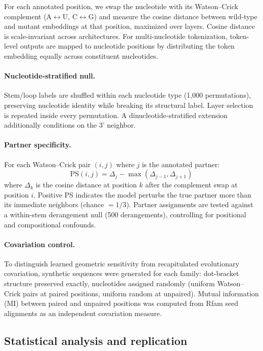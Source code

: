 \documentclass[11pt]{article}
\begin{document}
For each annotated position, we swap the nucleotide with its Watson--Crick
complement (A$\leftrightarrow$U, C$\leftrightarrow$G) and measure the cosine
distance between wild-type and mutant embeddings at that position, maximized
over layers. Cosine distance is scale-invariant across architectures.
For multi-nucleotide tokenization, token-level outputs are mapped to
nucleotide positions by distributing the token embedding equally across
constituent nucleotides.

\paragraph{Nucleotide-stratified null.}
Stem/loop labels are shuffled within each nucleotide type (1{,}000
permutations), preserving nucleotide identity while breaking its structural
label. Layer selection is repeated inside every permutation. A
dinucleotide-stratified extension additionally conditions on the 3' neighbor.

\paragraph{Partner specificity.}
\label{sec:ps-method}
For each Watson--Crick pair $(i, j)$ where $j$ is the annotated partner:
\[
\text{PS}(i,j) = \Delta_j - \max(\Delta_{j-1}, \Delta_{j+1})
\]
where $\Delta_k$ is the cosine distance at position $k$ after the complement
swap at position $i$. Positive PS indicates the model perturbs the true
partner more than its immediate neighbors (chance $= 1/3$). Partner
assignments are tested against a within-stem derangement null (500
derangements), controlling for positional and compositional confounds.

\paragraph{Covariation control.}
To distinguish learned geometric sensitivity from recapitulated evolutionary
covariation, synthetic sequences were generated for each family: dot-bracket
structure preserved exactly, nucleotides assigned randomly (uniform
Watson--Crick pairs at paired positions, uniform random at unpaired). Mutual
information (MI) between paired and unpaired positions was computed from Rfam
seed alignments as an independent covariation measure.

\subsection{Statistical analysis and replication}
\label{sec:stats}
\end{document}

